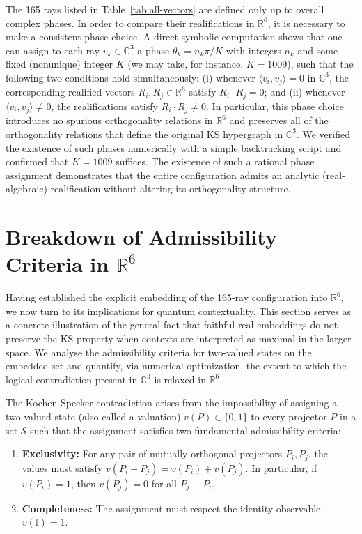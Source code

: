 \documentclass[%
  reprint,
  superscriptaddress,
  amsmath,amssymb,
  pra,
  floatfix,
  longbibliography
]{revtex4-2}
\begin{document}
The 165 rays listed in Table~\ref{tab:all-vectors} are defined only up to
overall complex phases.  In order to compare their realifications in
$\mathbb{R}^6$, it is necessary to make a consistent phase choice.  A
direct symbolic computation shows that one can assign to each ray
$v_k\in\mathbb{C}^3$ a phase
\(
  \theta_k = n_k\pi/K
\)
with integers $n_k$ and some fixed (nonunique) integer $K$
(we may take, for instance, $K=1009$), such that the following two conditions
hold simultaneously:
(i) whenever $\langle v_i,v_j\rangle=0$ in $\mathbb{C}^3$, the corresponding
realified vectors $R_i,R_j\in\mathbb{R}^6$ satisfy $R_i\cdot R_j=0$; and
(ii) whenever $\langle v_i,v_j\rangle\neq0$, the realifications satisfy
$R_i\cdot R_j\neq0$.
In particular, this phase choice introduces no spurious orthogonality
relations in $\mathbb{R}^6$ and preserves all of the orthogonality relations
that define the original KS hypergraph in $\mathbb{C}^3$.
We verified the existence of such phases numerically with a simple
backtracking script and confirmed that $K=1009$ suffices.
The existence of such a rational phase assignment demonstrates that the
entire configuration admits an analytic (real-algebraic) realification
without altering its orthogonality structure.





\section{Breakdown of Admissibility Criteria in \texorpdfstring{$\mathbb{R}^6$}{R6}}

Having established the explicit embedding of the 165-ray configuration into $\mathbb{R}^6$, we now turn to its implications for quantum contextuality. This section serves as a concrete illustration of the general fact that faithful real embeddings do not preserve the KS property when contexts are interpreted as maximal in the larger space. We analyse the admissibility criteria for two-valued states on the embedded set and quantify, via numerical optimization, the extent to which the logical contradiction present in $\mathbb{C}^3$ is relaxed in $\mathbb{R}^6$.

The Kochen-Specker contradiction arises from the impossibility of assigning a two-valued state (also called a valuation) $v(P) \in \{0,1\}$ to every projector $P$ in a set $\mathcal{S}$ such that the assignment satisfies two fundamental admissibility criteria:
\begin{enumerate}
    \item \textbf{Exclusivity:} For any pair of mutually orthogonal projectors $P_i, P_j$, the values must satisfy $v(P_i + P_j) = v(P_i) + v(P_j)$. In particular, if $v(P_i)=1$, then $v(P_j)=0$ for all $P_j \perp P_i$.
    \item \textbf{Completeness:} The assignment must respect the identity observable, $v(\mathbb{I}) = 1$.
\end{enumerate}
\end{document}
